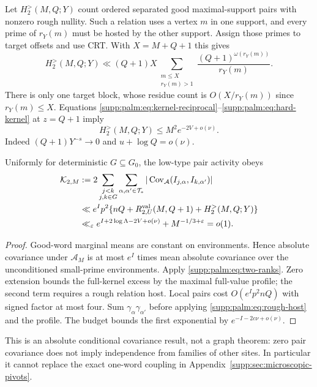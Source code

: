 Let $H_2^>(M,Q;Y)$ count ordered separated good maximal-support pairs with nonzero rough nullity. Such a relation uses a vertex $m$ in one support, and every prime of $r_Y(m)$ must be hosted by the other support. Assign those primes to target offsets and use CRT. With $X=M+Q+1$ this gives
\[
 H_2^>(M,Q;Y)\ll(Q+1)X
  \sum_{\substack{m\le X\\r_Y(m)>1}}
              \frac{(Q+1)^{\omega(r_Y(m))}}{r_Y(m)}.
\]
There is only one target block, whose residue count is $O(X/r_Y(m))$ since $r_Y(m)\le X$.
Equations \eqref{supp:palm:eq:kernel-reciprocal}--\eqref{supp:palm:eq:hard-kernel} at $z=Q+1$ imply
\begin{equation}\label{supp:palm:eq:rough-host}
 H_2^>(M,Q;Y)\le M^2e^{-2V+o(\nu)}.
\end{equation}
Indeed $(Q+1)Y^{-s}\to0$ and $u+\log Q=o(\nu)$.
\begin{proposition}\label{supp:palm:prop:pair-activity}
Uniformly for deterministic $G\subseteq G_0$, the low-type pair activity obeys
\begin{align}\label{supp:palm:eq:pair-activity}
 \mathcal K_{2,M}
 &:=2\sum_{\substack{j<k\\j,k\in G}}\sum_{\alpha,\alpha'\in\mathcal T_*}
          |\operatorname{Cov}_{\mathcal A}(I_{j,\alpha},I_{k,\alpha'})|\notag\\
 &\ll e^Ip^2\{nQ+R^{\rm val}_{2,U}(M,Q+1)+H_2^>(M,Q;Y)\}\notag\\
 &\ll_\varepsilon e^{I+2\log\Lambda-2V+o(\nu)}+M^{-1/3+\varepsilon}=o(1).
\end{align}
\end{proposition}
\begin{proof}
Good-word marginal means are constant on environments. Hence absolute covariance under $\mathcal A_M$ is at most $e^I$ times mean absolute covariance over the unconditioned small-prime environments. Apply \eqref{supp:palm:eq:two-ranks}. Zero extension bounds the full-kernel excess by the maximal full-value profile; the second term requires a rough relation host. Local pairs cost $O(e^Ip^2nQ)$ with signed factor at most four. Sum $\gamma_\alpha\gamma_{\alpha'}$ before applying \eqref{supp:palm:eq:rough-host} and the profile. The budget bounds the first exponential by $e^{-I-2c\nu+o(\nu)}$.
\end{proof}
This is an absolute conditional covariance result, not a graph theorem: zero pair covariance does not imply independence from families of other sites. In particular it cannot replace the exact one-word coupling in Appendix~\ref{supp:sec:microscopic-pivots}.

